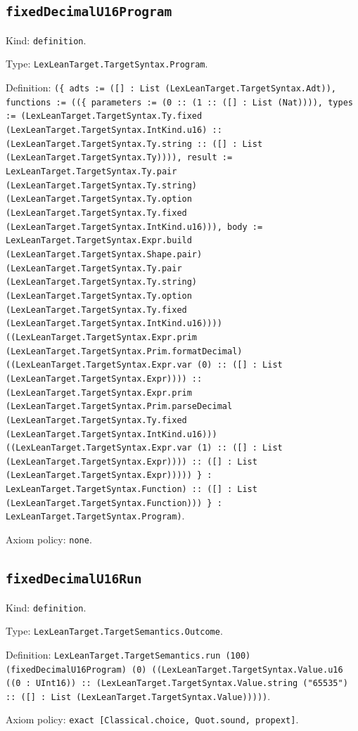 \documentclass[11pt]{article}
\begin{document}
\subsection*{\texttt{fixedDecimalU16Program}}
\noindent Kind: \texttt{definition}.\par
\noindent Type: \texttt{LexLeanTarget.TargetSyntax.Program}.\par
\noindent Definition: \texttt{(\{ adts := ([] : List (LexLeanTarget.TargetSyntax.Adt)), functions := ((\{ parameters := (0 :: (1 :: ([] : List (Nat)))), types := (LexLeanTarget.TargetSyntax.Ty.fixed (LexLeanTarget.TargetSyntax.IntKind.u16) :: (LexLeanTarget.TargetSyntax.Ty.string :: ([] : List (LexLeanTarget.TargetSyntax.Ty)))), result := LexLeanTarget.TargetSyntax.Ty.pair (LexLeanTarget.TargetSyntax.Ty.string) (LexLeanTarget.TargetSyntax.Ty.option (LexLeanTarget.TargetSyntax.Ty.fixed (LexLeanTarget.TargetSyntax.IntKind.u16))), body := LexLeanTarget.TargetSyntax.Expr.build (LexLeanTarget.TargetSyntax.Shape.pair) (LexLeanTarget.TargetSyntax.Ty.pair (LexLeanTarget.TargetSyntax.Ty.string) (LexLeanTarget.TargetSyntax.Ty.option (LexLeanTarget.TargetSyntax.Ty.fixed (LexLeanTarget.TargetSyntax.IntKind.u16)))) ((LexLeanTarget.TargetSyntax.Expr.prim (LexLeanTarget.TargetSyntax.Prim.formatDecimal) ((LexLeanTarget.TargetSyntax.Expr.var (0) :: ([] : List (LexLeanTarget.TargetSyntax.Expr)))) :: (LexLeanTarget.TargetSyntax.Expr.prim (LexLeanTarget.TargetSyntax.Prim.parseDecimal (LexLeanTarget.TargetSyntax.Ty.fixed (LexLeanTarget.TargetSyntax.IntKind.u16))) ((LexLeanTarget.TargetSyntax.Expr.var (1) :: ([] : List (LexLeanTarget.TargetSyntax.Expr)))) :: ([] : List (LexLeanTarget.TargetSyntax.Expr))))) \} : LexLeanTarget.TargetSyntax.Function) :: ([] : List (LexLeanTarget.TargetSyntax.Function))) \} : LexLeanTarget.TargetSyntax.Program)}.\par
\noindent Axiom policy: \texttt{none}.\par
\subsection*{\texttt{fixedDecimalU16Run}}
\noindent Kind: \texttt{definition}.\par
\noindent Type: \texttt{LexLeanTarget.TargetSemantics.Outcome}.\par
\noindent Definition: \texttt{LexLeanTarget.TargetSemantics.run (100) (fixedDecimalU16Program) (0) ((LexLeanTarget.TargetSyntax.Value.u16 ((0 : UInt16)) :: (LexLeanTarget.TargetSyntax.Value.string ("65535") :: ([] : List (LexLeanTarget.TargetSyntax.Value)))))}.\par
\noindent Axiom policy: \texttt{exact [Classical.choice, Quot.sound, propext]}.\par
\end{document}
